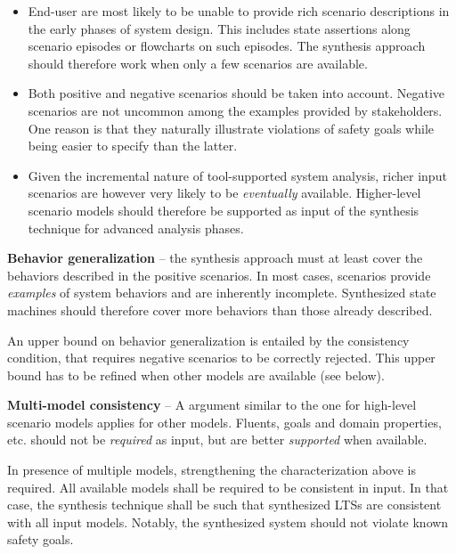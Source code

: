 \begin{itemize}

\item End-user are most likely to be unable to provide rich scenario descriptions in the early phases of system design. This includes state assertions along scenario episodes or flowcharts on such episodes. The synthesis approach should therefore work when only a few scenarios are available. 

\item Both positive and negative scenarios should be taken into account. Negative scenarios are not uncommon among the examples provided by stakeholders. One reason is that they naturally illustrate violations of safety goals while being easier to specify than the latter.

\item Given the incremental nature of tool-supported system analysis, richer input scenarios are however very likely to be \emph{eventually} available. Higher-level scenario models should therefore be supported as input of the synthesis technique for advanced analysis phases.

\end{itemize}

\noindent \textbf{Behavior generalization} -- the synthesis approach must at least cover the behaviors described in the positive scenarios. In most cases, scenarios provide \emph{examples} of system behaviors and are inherently incomplete. Synthesized state machines should therefore cover more behaviors than those already described. 

An upper bound on behavior generalization is entailed by the consistency condition, that requires negative scenarios to be correctly rejected. This upper bound has to be refined when other models are available (see below).

\noindent \textbf{Multi-model consistency} -- A argument similar to the one for high-level scenario models applies for other models. Fluents, goals and domain properties, etc. should not be \emph{required} as input, but are better \emph{supported} when available. 

In presence of multiple models, strengthening the characterization above is required. All available models shall be required to be consistent in input. In that case, the synthesis technique shall be such that synthesized LTSs are consistent with all input models. Notably, the synthesized system should not violate known safety goals.

